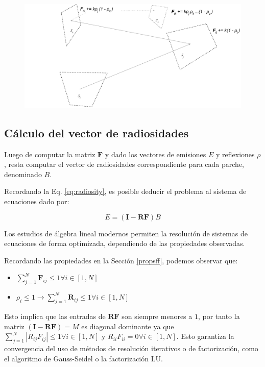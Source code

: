 \vspace{5mm}
\begin{figure}[htbp]
	\includegraphics[width=1\linewidth]{assets/extended}
	\label{img:caminoespecular}
\end{figure}

\subsection{Cálculo del vector de radiosidades}
\label{sec:vrad}

Luego de computar la matriz $\mathbf{F}$ y dado los vectores de emisiones $E$ y reflexiones $\rho$, resta computar el vector de radiosidades correspondiente para cada parche, denominado $B$.

Recordando la Eq. \eqref{eq:radiosity}, es posible deducir el problema al sistema de ecuaciones dado por:

\begin{equation}
	E = (\mathbf{I} - \mathbf{RF})B
\end{equation}

Los estudios de álgebra lineal modernos permiten la resolución de sistemas de ecuaciones de forma optimizada, dependiendo de las propiedades observadas.

Recordando las propiedades en la Sección \ref{propsff}, podemos observar que:

\begin{itemize}
	\item $\sum_{j=1}^{N} \mathbf{F}_{ij} \leq 1 \forall{i \in [1,N]}$
	\item $\rho_{i} \leq 1 \rightarrow \sum_{j=1}^{N} \mathbf{R}_{ij} \leq 1 \forall{i \in [1,N]}$
\end{itemize}

Esto implica que las entradas de $\mathbf{RF}$ s\texttt{}on siempre menores a $1$, por tanto la matriz $(\mathbf{I} - \mathbf{RF}) = M$ es diagonal dominante ya que $\sum_{j=1}^{N}|R_{ij}F_{ij}| \le 1 \forall i \in [1, N]$ y $R_{ii}F_{ii} = 0  \forall  i \in [1,N]$. Esto garantiza la convergencia del uso de métodos de resolución iterativos o de factorización, como el algoritmo de Gauss-Seidel o la factorización LU.

